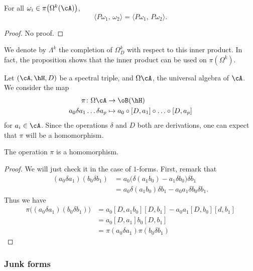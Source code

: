 \begin{proposition}
For all $\omega_i\in\pi\big( \Omega^k(\cA) \big)$,
\[ 
  \langle P\omega_1,\,\omega_2\rangle=\langle P\omega_1,\,P\omega_2\rangle.
\]

\end{proposition}
\begin{proof}
No proof.
\end{proof}
We denote by $\Lambda^k$ the completion of $\Omega^k_D$ with respect to this inner product. In fact, the proposition shows that the inner product can be used on $\pi(\Omega^k)$.



Let $(\cA,\hH,D)$ be a spectral triple, and $\Omega\cA$, the universal algebra of $\cA$. We consider the map
\begin{equation}	\label{EqDEfpirep}
\begin{aligned}
 \pi\colon\Omega\cA&\to \oB(\hH) \\ 
a_0\delta a_1\ldots\delta a_p&\mapsto a_0\circ[D,a_1]\circ\ldots\circ [D,a_p] 
\end{aligned}
\end{equation}
for $a_i\in\cA$. Since the operations $\delta$ and $D$ both are derivations, one can expect that $\pi$ will be a homomorphism.

\begin{proposition}
The operation $\pi$ is a homomorphism.
\end{proposition}
\begin{proof}
We will just check it in the case of $1$-forms. First, remark that
\[ 
 \begin{split}
(a_0\delta a_1)(b_0\delta b_1)&=a_0\big( \delta(a_1b_0)-a_1\delta b_0 \big)\delta b_1\\
		&=a_0\delta(a_1b_0)\delta b_1-a_0a_1\delta b_0\delta b_1.
\end{split} 
\]
Thus we have
\[ 
 \begin{split}
\pi\big( (a_0\delta a_1)(b_0\delta b_1) \big)&=a_0[D,a_1b_0][D,b_1]-a_0a_1[D,b_0][d,b_1]\\
		&=a_0[D,a_1]b_0[D,b_1]\\
  		&=\pi(a_0\delta a_1)\pi(b_0\delta b_1)
\end{split} 
\]

\end{proof}

\subsubsection{Junk forms}

